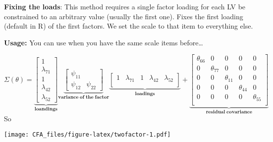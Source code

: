 \documentclass[
]{article}
\newenvironment{Shaded}{\begin{snugshade}}{\end{snugshade}}
\newcommand{\FunctionTok}[1]{\textcolor[rgb]{0.00,0.00,0.00}{#1}}
\newcommand{\NormalTok}[1]{#1}
\newcommand{\SpecialCharTok}[1]{\textcolor[rgb]{0.00,0.00,0.00}{#1}}
\begin{document}
\textbf{Fixing the loads}: This method requires a single factor loading
for each LV be constrained to an arbitrary value (usually the first
one). Fixes the first loading (default in R) of the first factors. We
set the scale to that item to everything else.

\textbf{Usage:} You can use when you have the same scale items
before\ldots{}

\[
\Sigma(\theta)=\underbrace{\begin{bmatrix}
1     \\
\lambda_{71}     \\
1     \\
\lambda_{42}     \\
\lambda_{52}     
            \end{bmatrix}
 }_{\mathbf{loandings}} \underbrace{\begin{bmatrix}
\psi_{11} & \\
\psi_{12} & \psi_{22}
            \end{bmatrix}
 }_{\mathbf{variance \; of \; the \;factor}} \underbrace{\begin{bmatrix}
1  & \lambda_{71}  & 1 & \lambda_{42} & \lambda_{52} \\
            \end{bmatrix}
 }_{\mathbf{loadings}} + \underbrace{\begin{bmatrix}
\theta_{66} & 0 & 0 & 0 & 0  \\
0 & \theta_{77} & 0 & 0 & 0   \\
0 & 0 & \theta_{11} & 0 & 0    \\
0 & 0 & 0 & \theta_{44} & 0    \\
0 & 0 & 0 & 0 & \theta_{55}    \\
            \end{bmatrix}
            }_{\mathbf{residual \; covariance}}
\] So

\texttt{[image: CFA\_files/figure-latex/twofactor-1.pdf]}

\begin{Shaded}
\end{Shaded}
\end{document}
